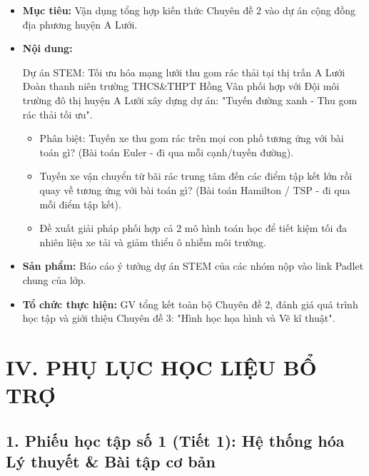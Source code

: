 \documentclass[12pt, a4paper]{article}
\begin{document}
\begin{itemize}[leftmargin=1.2cm]
    \item[a)] \textbf{Mục tiêu:} Vận dụng tổng hợp kiến thức Chuyên đề 2 vào dự án cộng đồng địa phương huyện A Lưới.
    \item[b)] \textbf{Nội dung:}
    \begin{stembox}{Dự án STEM: Tối ưu hóa mạng lưới thu gom rác thải tại thị trấn A Lưới}
        Đoàn thanh niên trường THCS\&THPT Hồng Vân phối hợp với Đội môi trường đô thị huyện A Lưới xây dựng dự án: "Tuyến đường xanh - Thu gom rác thải tối ưu".
        \begin{itemize}[leftmargin=0.6cm]
            \item Phân biệt: Tuyến xe thu gom rác trên mọi con phố tương ứng với bài toán gì? (Bài toán Euler - đi qua mỗi cạnh/tuyến đường).
            \item Tuyến xe vận chuyển từ bãi rác trung tâm đến các điểm tập kết lớn rồi quay về tương ứng với bài toán gì? (Bài toán Hamilton / TSP - đi qua mỗi điểm tập kết).
            \item Đề xuất giải pháp phối hợp cả 2 mô hình toán học để tiết kiệm tối đa nhiên liệu xe tải và giảm thiểu ô nhiễm môi trường.
        \end{itemize}
    \end{stembox}
    \item[c)] \textbf{Sản phẩm:} Báo cáo ý tưởng dự án STEM của các nhóm nộp vào link Padlet chung của lớp.
    \item[d)] \textbf{Tổ chức thực hiện:} GV tổng kết toàn bộ Chuyên đề 2, đánh giá quá trình học tập và giới thiệu Chuyên đề 3: "Hình học họa hình và Vẽ kĩ thuật".
\end{itemize}

\section*{IV. PHỤ LỤC HỌC LIỆU BỔ TRỢ}

\subsection*{1. Phiếu học tập số 1 (Tiết 1): Hệ thống hóa Lý thuyết \& Bài tập cơ bản}
\end{document}
